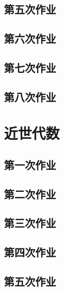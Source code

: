 \documentclass[
	leqno, %
	a4paper, %
	fontsize=12pt, %
	twoside=false, %
	open=any, %
	chapterentrydots=true, %
	numbers=noenddot, %
    UTF-8, %
	toc=nottotoc,
	BCOR=12mm,
	DIV=calc,
]{styles/kaobook}
\begin{document}
\section{第五次作业}

\section{第六次作业}

\section{第七次作业}

\section{第八次作业}



\setchapterpreamble[u]{\margintoc}
\chapter{近世代数}











\section{第一次作业}

\section{第二次作业}

\section{第三次作业}

\section{第四次作业}

\section{第五次作业}

\end{document}
